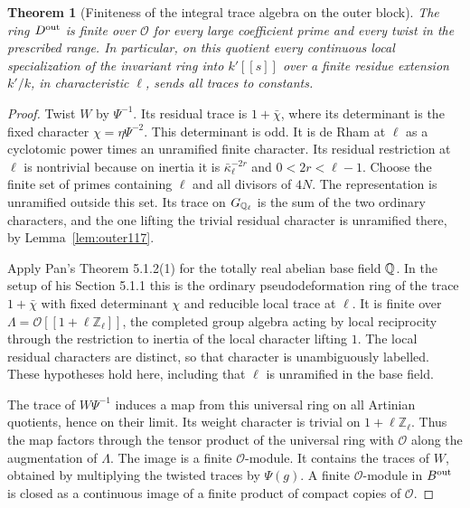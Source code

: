 \documentclass[a4paper,11pt]{article}
\newtheorem{theorem}[proposition]{Theorem}
\theoremstyle{definition}
\theoremstyle{remark}
\newcommand{\ZZ}{\mathbb Z}\newcommand{\ord}{\operatorname{ord}}
\numberwithin{equation}{section}
\newcommand{\OO}{\mathcal O}
\begin{document}
\begin{theorem}[Finiteness of the integral trace algebra on the outer block]
\label{thm:finite117}
The ring \(D^{\rm out}\) is finite over \(\OO\) for every
large coefficient prime and every twist in the prescribed range.
In particular, on this quotient every continuous local
specialization of the invariant ring into \(k'[[s]]\) over a
finite residue extension \(k'/k\), in characteristic \(\ell\),
sends all traces to constants.
\end{theorem}
\begin{proof}
Twist \(W\) by \(\Psi^{-1}\). Its residual trace is
\(1+\bar\chi\), where its determinant is the fixed character
\(\chi=\eta\Psi^{-2}\). This determinant is odd. It is de Rham
at \(\ell\) as a cyclotomic power times an unramified finite
character. Its residual restriction at \(\ell\) is nontrivial
because on inertia it is \(\bar\kappa_\ell^{-2r}\) and
\(0<2r<\ell-1\). Choose the finite set of primes containing
\(\ell\) and all divisors of \(4N\). The representation is
unramified outside this set. Its trace on \(G_{\mathbb Q_\ell}\) is
the sum of the two ordinary characters, and the one lifting
the trivial residual character is unramified there, by
Lemma~\ref{lem:outer117}.

Apply Pan's Theorem 5.1.2(1) for the totally real abelian base
field \(\mathbb Q\). In the setup of his Section 5.1.1 this is the
ordinary pseudodeformation ring of the trace \(1+\bar\chi\)
with fixed determinant \(\chi\) and reducible local trace at
\(\ell\). It is finite over
\(\Lambda=\OO[[1+\ell\ZZ_\ell]]\), the completed group algebra
acting by local reciprocity through the restriction to inertia
of the local character lifting \(1\). The local residual
characters are distinct, so that character is unambiguously
labelled. These hypotheses hold here, including that \(\ell\)
is unramified in the base field.~\cite{VI-IV-VI-pan40}

The trace of \(W\Psi^{-1}\) induces a map from this universal
ring on all Artinian quotients, hence on their limit. Its weight
character is trivial on \(1+\ell\ZZ_\ell\). Thus the map factors
through the tensor product of the universal ring with \(\OO\)
along the augmentation of \(\Lambda\). The image is a finite
\(\OO\)-module. It contains the traces of \(W\), obtained by
multiplying the twisted traces by \(\Psi(g)\). A finite
\(\OO\)-module in \(B^{\rm out}\) is closed as a continuous
image of a finite product of compact copies of \(\OO\).


\end{proof}
\end{document}
